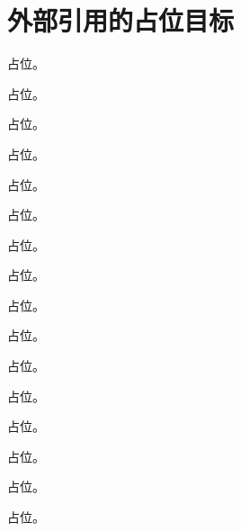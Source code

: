 \chapter{外部引用的占位目标}
\begin{assumption}[占位]\label{asm:appN-ir-regulator}占位。\end{assumption}
\begin{assumption}[占位]\label{asm:intro-growth}占位。\end{assumption}
\begin{assumption}[占位]\label{asm:intro-np-ope}占位。\end{assumption}
\begin{assumption}[占位]\label{asm:lamet-gap}占位。\end{assumption}
\begin{assumption}[占位]\label{asm:lamet-large-z}占位。\end{assumption}
\begin{assumption}[占位]\label{asm:lamet-ope}占位。\end{assumption}
\begin{assumption}[占位]\label{asm:lamet-twist4}占位。\end{assumption}
\begin{assumption}[占位]\label{asm:lamet-uniform}占位。\end{assumption}
\begin{assumption}[占位]\label{asm:yzliu-heavy-pair}占位。\end{assumption}
\begin{assumption}[占位]\label{asm:yzliu-lightcone-uniform}占位。\end{assumption}
\begin{assumption}[占位]\label{asm:yzliu-wightman-pt}占位。\end{assumption}
\begin{conjecture}[占位]\label{conj:lamet-decay-qcd}占位。\end{conjecture}
\begin{conjecture}[占位]\label{conj:power-renormalon-ht}占位。\end{conjecture}
\begin{conjecture}[占位]\label{conj:yzliu-renormalon-norm}占位。\end{conjecture}
\begin{corollary}[占位]\label{cor:lamet-endpoint}占位。\end{corollary}
\begin{definition}[占位]\label{def:power-borel}占位。\end{definition}

